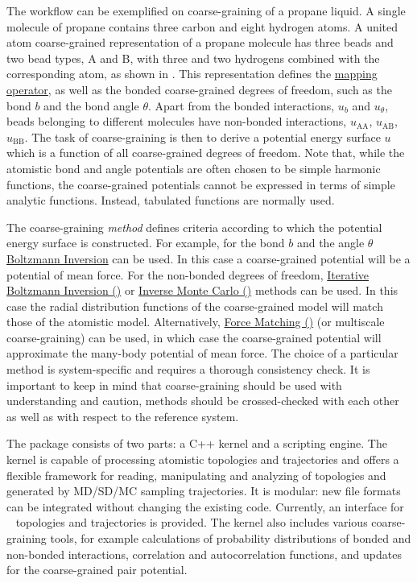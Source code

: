 The workflow can be exemplified on coarse-graining of a propane liquid. A single molecule of propane contains three carbon and eight hydrogen atoms. A united atom coarse-grained representation of a propane molecule has three beads and two bead types, A and B, with three and two hydrogens combined with the corresponding atom, as shown in . This representation defines the \hyperref[sec:mapping_operator]{mapping operator}, as well as the bonded coarse-grained degrees of freedom, such as the bond $b$ and the bond angle $\theta$. Apart from the bonded interactions, $u_b$ and $u_\theta$, beads belonging to different molecules have non-bonded interactions, $u_\text{AA}$, $u_\text{AB}$, $u_\text{BB}$. The task of coarse-graining is then to derive a potential energy surface $u$ which is a function of all coarse-grained degrees of freedom. Note that, while the atomistic bond and angle potentials are often chosen to be simple harmonic functions, the coarse-grained potentials cannot be expressed in terms of simple analytic functions. Instead, tabulated functions are normally used.

The coarse-graining {\em method} defines criteria according to which the potential energy surface is constructed. For example, for the bond $b$ and the angle $\theta$  \hyperref[sec:bi]{Boltzmann Inversion} can be used. In this case a coarse-grained potential will be a potential of mean force. For the non-bonded degrees of freedom,
\hyperref[sec:ibi]{Iterative Boltzmann Inversion (\ibi)} or \hyperref[sec:imc]{Inverse Monte Carlo (\imc)} methods can be used. In this case the radial distribution functions of the coarse-grained model will match those of the atomistic model. Alternatively, \hyperref[sec:fm]{Force Matching (\fm)} (or multiscale coarse-graining) can be used, in which case the coarse-grained potential will approximate the many-body potential of mean force. The choice of a particular method is system-specific and requires a thorough consistency check. It is important to keep in mind that coarse-graining should be used with understanding and caution, methods should be crossed-checked with each other as well as with respect to the reference system.

The package consists of two parts: a C++ kernel and a scripting engine. The kernel is capable of processing atomistic topologies and trajectories and offers a flexible framework for reading, manipulating and analyzing of topologies and generated by MD/SD/MC sampling trajectories. It is modular: new file formats can be integrated without changing the existing code. Currently, an interface for \gromacs~\cite{gromacs4} topologies and trajectories is provided.
%
The kernel also includes various coarse-graining tools, for example calculations of probability distributions of bonded and non-bonded interactions, correlation and autocorrelation functions, and updates for the coarse-grained pair potential.

